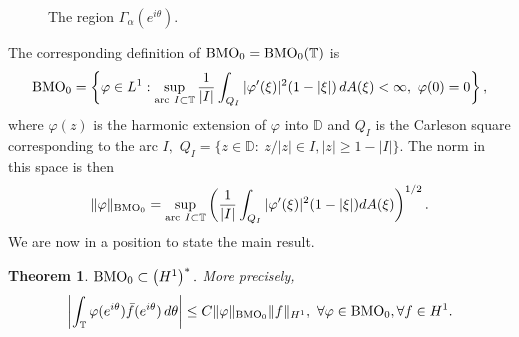 \documentclass[psamsfonts]{conm-p-l}
\newtheorem{theorem}{Theorem}[section]
\theoremstyle{definition}
\theoremstyle{remark}
\numberwithin{equation}{section}
\begin{document}
\begin{figure}[ht]
\caption{The region $\Gamma_\alpha(e^{i\theta}).$}
\end{figure}

The corresponding definition of ${{\rm{BMO}}}_0={{\rm{BMO}}}_0(\mathbb{T})$ is 
{\begin{equation}\label{d3}{
{{\rm{BMO}}}_0=\left\{\varphi\in L^1:\sup_{{\rm arc~}I\subset \mathbb{T}}\frac1{|I|}\int_{Q_I}|\varphi'(\xi)|^2(1-|\xi|)\,dA(\xi)<\infty,
~\varphi(0)=0\right\},
}\end{equation}}
where $\varphi(z)$ is the harmonic extension of $\varphi$ into $\mathbb{D}$ and $Q_I$ is the Carleson square corresponding to the arc $I,$ $Q_I=\{z\in \mathbb{D}:~z/|z|\in I, |z|\ge1-|I|\}.$ The norm in this space is then 
$$
{\displaystyle} \| \varphi\|_{{{\rm{BMO}}}_0}=
\sup_{{\rm arc~}I\subset \mathbb{T}}\left(\frac1{|I|}\int_{Q_I}|\varphi'(\xi)|^2(1-|\xi|)dA(\xi)\right)^{1/2}.
$$
We are now in a position to state the main result.
\begin{theorem}
${\displaystyle} {{\rm{BMO}}}_0\subset \left(H^1\right)^*.$ More precisely,
{\begin{equation}\label{d5}{
\left|\int_\mathbb{T}\varphi(e^{i\theta})\bar{f}(e^{i\theta})\,d\theta\right|\le C\| \varphi \|_{{{\rm{BMO}}}_0}\| f\|_{H^1},
~\forall \varphi\in {{\rm{BMO}}}_0, \forall f\in H^1.
}\end{equation}}
\end{theorem}
\end{document}

